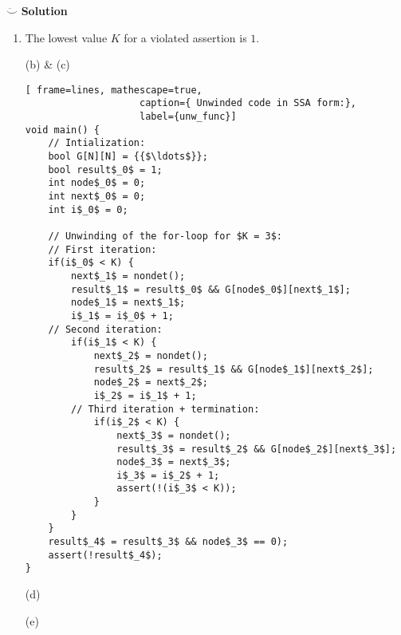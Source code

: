 $\ddot\smile$ \textbf{Solution}\\
\begin{enumerate}
\item
The lowest value $K$ for a violated assertion is $1$.

\item[(b) \& (c)] \quad
\medskip
\begin{lstlisting}[	frame=lines, mathescape=true,
					caption={ Unwinded code in SSA form:},
					label={unw_func}]
void main() {
	// Intialization:
	bool G[N][N] = {{$\ldots$}};
	bool result$_0$ = 1;
	int node$_0$ = 0;
	int next$_0$ = 0;
	int i$_0$ = 0;
	
	// Unwinding of the for-loop for $K = 3$:
	// First iteration:
	if(i$_0$ < K) {
		next$_1$ = nondet();
		result$_1$ = result$_0$ && G[node$_0$][next$_1$];
		node$_1$ = next$_1$;
		i$_1$ = i$_0$ + 1;
	// Second iteration:
		if(i$_1$ < K) {
			next$_2$ = nondet();
			result$_2$ = result$_1$ && G[node$_1$][next$_2$];
			node$_2$ = next$_2$;
			i$_2$ = i$_1$ + 1;
		// Third iteration + termination:
			if(i$_2$ < K) {
				next$_3$ = nondet();
				result$_3$ = result$_2$ && G[node$_2$][next$_3$];
				node$_3$ = next$_3$;
				i$_3$ = i$_2$ + 1;
				assert(!(i$_3$ < K));
			}
		}
	}
	result$_4$ = result$_3$ && node$_3$ == 0);
	assert(!result$_4$);
}
\end{lstlisting}

\item[(d)]
\item[(e)]
\end{enumerate}